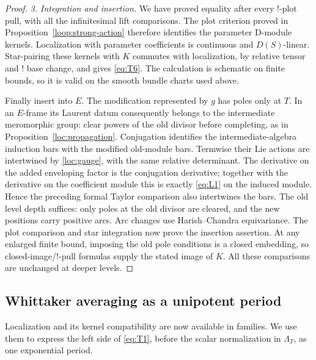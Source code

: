 \documentclass[11pt]{article}
\numberwithin{equation}{section}
\theoremstyle{definition}
\theoremstyle{remark}
\begin{document}
\begin{proof}
\emph{3. Integration and insertion.}
We have proved equality after every $!$-plot pull, with all the
infinitesimal lift comparisons.  The plot criterion proved in
Proposition~\ref{loop:strong-action} therefore identifies the parameter D-module kernels.  Localization
with parameter coefficients is continuous and $D(S)$-linear.
Star-pairing these kernels with $K$ commutes with localization, by
relative tensor and $!$ base change, and gives \eqref{eq:T6}.  The
calculation is schematic on finite bounds, so it is valid on the
smooth bundle charts used above.

Finally insert into $E$.  The modification represented by $g$ has
poles only at $T$.  In an $E$-frame its Laurent datum consequently
belongs to the intermediate meromorphic group: clear powers of the
old divisor before completing, as in
Proposition~\ref{loc:propagation}.  Conjugation identifies the
intermediate-algebra induction bars with the modified old-module
bars.  Termwise their Lie actions are intertwined by
\eqref{loc:gauge}, with the same relative determinant.  The derivative
on the added enveloping factor is the conjugation derivative; together
with the derivative on the coefficient module this is exactly
\eqref{eq:L1} on the induced module.  Hence the preceding formal Taylor
comparison also intertwines the bars.  The old level depth suffices:
only poles at the old divisor are cleared, and the new positions
carry positive arcs.  Arc changes use Harish--Chandra equivariance.
The plot comparison and star integration now prove the insertion
assertion.  At any enlarged finite bound, imposing the old pole
conditions is a closed embedding, so closed-image/$!$-pull formulas
supply the stated image of $K$.  All these comparisons are unchanged
at deeper levels.
\end{proof}

\subsection{Whittaker averaging as a unipotent period}

Localization and its kernel compatibility are now available in
families.  We use them to express the left side of \eqref{eq:T1},
before the scalar normalization in $\Lambda_T$, as one exponential
period.
\end{document}
